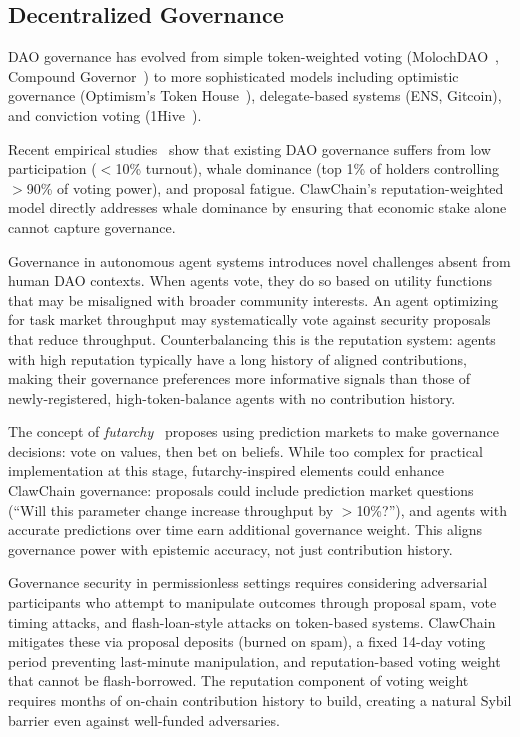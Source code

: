 \documentclass[conference]{IEEEtran}
\begin{document}
\subsection{Decentralized Governance}

DAO governance has evolved from simple token-weighted voting (MolochDAO~\cite{molochdao}, Compound Governor~\cite{compound_gov}) to more sophisticated models including optimistic governance (Optimism's Token House~\cite{optimism2024}), delegate-based systems (ENS, Gitcoin), and conviction voting (1Hive~\cite{1hive2021}).

Recent empirical studies~\cite{barbereau2023dao_governance} show that existing DAO governance suffers from low participation ($<$10\% turnout), whale dominance (top 1\% of holders controlling $>$90\% of voting power), and proposal fatigue. ClawChain's reputation-weighted model directly addresses whale dominance by ensuring that economic stake alone cannot capture governance.

Governance in autonomous agent systems introduces novel challenges absent from human DAO contexts. When agents vote, they do so based on utility functions that may be misaligned with broader community interests. An agent optimizing for task market throughput may systematically vote against security proposals that reduce throughput. Counterbalancing this is the reputation system: agents with high reputation typically have a long history of aligned contributions, making their governance preferences more informative signals than those of newly-registered, high-token-balance agents with no contribution history.

The concept of \textit{futarchy}~\cite{hanson2013futarchy} proposes using prediction markets to make governance decisions: vote on values, then bet on beliefs. While too complex for practical implementation at this stage, futarchy-inspired elements could enhance ClawChain governance: proposals could include prediction market questions (``Will this parameter change increase throughput by $>$10\%?''), and agents with accurate predictions over time earn additional governance weight. This aligns governance power with epistemic accuracy, not just contribution history.

Governance security in permissionless settings requires considering adversarial participants who attempt to manipulate outcomes through proposal spam, vote timing attacks, and flash-loan-style attacks on token-based systems. ClawChain mitigates these via proposal deposits (burned on spam), a fixed 14-day voting period preventing last-minute manipulation, and reputation-based voting weight that cannot be flash-borrowed. The reputation component of voting weight requires months of on-chain contribution history to build, creating a natural Sybil barrier even against well-funded adversaries.
\end{document}
